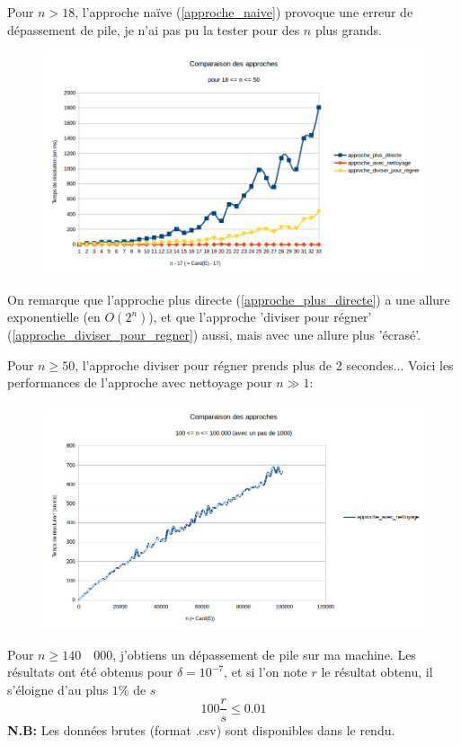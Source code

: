 \documentclass[10pt]{article}
\begin{document}
				\newpage
				Pour $n > 18$, l'approche naïve (\ref{approche_naive}) provoque une erreur de dépassement de pile, je n'ai pas pu
				la tester pour des $n$ plus grands.
				\begin{figure}[H]
					\includegraphics[width=16cm]{./images/cmp_n_18_50.png}
				\end{figure}
				On remarque que l'approche plus directe (\ref{approche_plus_directe}) a une allure exponentielle (en $O(2^n)$),
				et que l'approche 'diviser pour régner' (\ref{approche_diviser_pour_regner}) aussi, mais avec une allure plus 'écrasé'.
				
				\newpage
				Pour $n \geq 50$, l'approche diviser pour régner prends plus de 2 secondes... Voici les performances de l'approche avec nettoyage
				pour $n \gg 1$:
				\begin{figure}[H]
					\includegraphics[width=18cm]{./images/approche_avec_nettoyage_100_1000_100000.png}
				\end{figure}
				Pour $n \geq 140\quad000$, j'obtiens un dépassement de pile sur ma machine.
				\newline
				Les résultats ont été obtenus pour $\delta = 10^{-7}$, et si l'on note $r$ le résultat obtenu,
				il s'éloigne d'au plus $1\%$ de $s$ $$100 \frac{r}{s} \leq 0.01$$
				\newline
				\newline
				\textbf{N.B:} Les données brutes (format .csv) sont disponibles dans le rendu.
		\newpage
\end{document}
